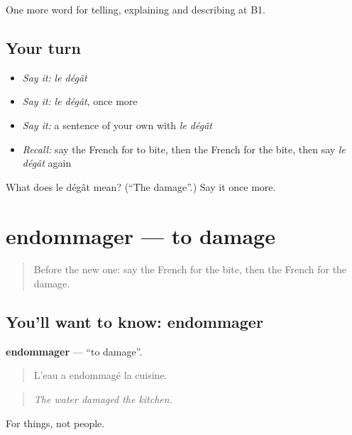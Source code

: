 \begin{grammarlens}[title={What you've built}]
One more word for telling, explaining and describing at B1.
\end{grammarlens}

\subsection*{Your turn}
\begin{itemize}
\raggedright
  \item \emph{Say it:} \emph{le dégât}
  \item \emph{Say it:} \emph{le dégât}, once more
  \item \emph{Say it:} a sentence of your own with \emph{le dégât}
  \item \emph{Recall:} say the French for to bite, then the French for the bite, then say \emph{le dégât} again
\end{itemize}

\begin{tcolorbox}[breakable,colback=teal!4,colframe=teal!35!black,title={Before you move on}]
What does le dégât mean? (\textquotedblleft{}The damage\textquotedblright{}.) Say it once more.
\end{tcolorbox}
\section[endommager]{endommager — to damage}

\label{lesson:FR-C307-endommager}



\begin{quote}
Before the new one: say the French for the bite, then the French for the damage.
\end{quote}

\subsection*{You'll want to know: endommager}
\textbf{endommager} — \textquotedblleft{}to damage\textquotedblright{}.

\begin{quote}
L'eau a endommagé la cuisine.
\end{quote}

\begin{quote}
\emph{The water damaged the kitchen.}
\end{quote}

For things, not people.

